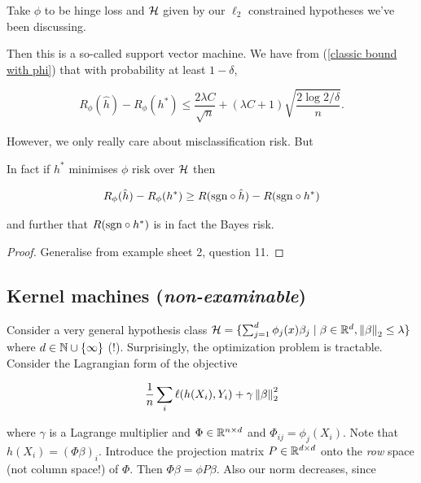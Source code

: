 \documentclass[11pt]{scrartcl}
\begin{document}
\begin{example}
\label{SVM theory}
Take $\phi$ to be hinge loss and $\mathcal{H}$ given by our $\ell_2$ constrained hypotheses we've been discussing.

Then this is a so-called support vector machine. We have from (\ref{classic bound with phi}) that with probability at least $1 - \delta$,

\begin{equation}
    R_\phi(\hat{h}) - R_\phi(h^*) \le \frac{2 \lambda C}{\sqrt{n}} + (\lambda C + 1) \sqrt{\frac{2 \log 2/\delta}{n}}.
\end{equation}
\end{example}

However, we only really care about misclassification risk. But

\begin{theorem}

In fact if $h^*$ minimises $\phi$ risk over $\mathcal{H}$ then

\begin{equation}
    R_\phi(\hat{h}) - R_\phi(h^*) \ge R(\text{sgn} \circ \hat{h}) - R(\text{sgn} \circ h^*)
\end{equation}

and further that $R(\text{sgn} \circ h^*)$ is in fact the Bayes risk.

\begin{proof} %
Generalise from example sheet 2, question 11. %
\end{proof}
\end{theorem}

\subsection{Kernel machines (\textit{non-examinable})}

Consider a very general hypothesis class $\mathcal{H} = \{ \sum_{j=1}^d \phi_j(x) \beta_j \mid \beta \in \mathbb R^d, \left\lVert\beta\right\rVert_2 \le \lambda \}$ where $d \in \mathbb N \cup \{ \infty \}$ (!). Surprisingly, the optimization problem is tractable. Consider the Lagrangian form of the objective

\begin{equation}
    \frac1n \sum_{i} \ell(h(X_i), Y_i) + \gamma \left\lVert\beta\right\rVert_2^2
\end{equation}

where $\gamma$ is a Lagrange multiplier and $\Phi \in \mathbb R^{n \times d}$ and $\Phi_{ij} = \phi_j(X_i)$. Note that $h(X_i) = (\Phi \beta)_i$. Introduce the projection matrix $P\in \mathbb R^{d \times d}$ onto the \emph{row} space (not column space!) of $\Phi$. Then $\Phi \beta = \phi P \beta$. Also our norm decreases, since 
\end{document}
